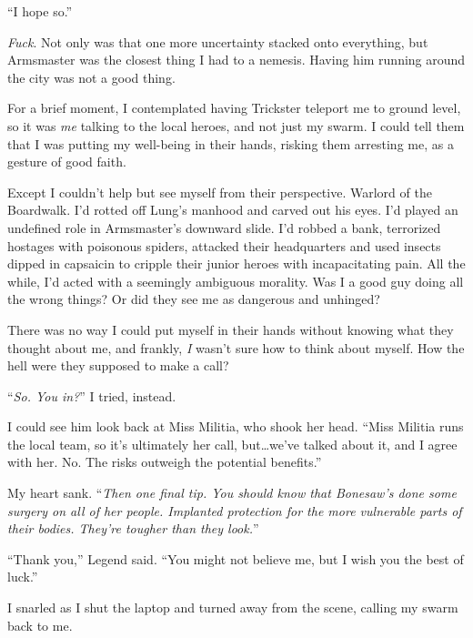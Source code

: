 ``I hope so.''



\emph{Fuck}.  Not only was that one more uncertainty stacked onto everything, but Armsmaster was the closest thing I had to a nemesis.  Having him running around the city was not a good thing.



For a brief moment, I contemplated having Trickster teleport me to ground level, so it was \emph{me} talking to the local heroes, and not just my swarm.  I could tell them that I was putting my well-being in their hands, risking them arresting me, as a gesture of good faith.



Except I couldn't help but see myself from their perspective.  Warlord of the Boardwalk.  I'd rotted off Lung's manhood and carved out his eyes.  I'd played an undefined role in Armsmaster's downward slide.  I'd robbed a bank, terrorized hostages with poisonous spiders, attacked their headquarters and used insects dipped in capsaicin to cripple their junior heroes with incapacitating pain.  All the while, I'd acted with a seemingly ambiguous morality.  Was I a good guy doing all the wrong things?  Or did they see me as dangerous and unhinged?



There was no way I could put myself in their hands without knowing what they thought about me, and frankly, \emph{I} wasn't sure how to think about myself.  How the hell were they supposed to make a call?



``\emph{So.  You in?}''  I tried, instead.



I could see him look back at Miss Militia, who shook her head.  ``Miss Militia runs the local team, so it's ultimately her call, but\ldots we've talked about it, and I agree with her.  No.  The risks outweigh the potential benefits.''



My heart sank.  ``\emph{Then one final tip.  You should know that Bonesaw's done some surgery on all of her people.  Implanted protection for the more vulnerable parts of their bodies.  They're tougher than they look.}''



``Thank you,'' Legend said.  ``You might not believe me, but I wish you the best of luck.''



I snarled as I shut the laptop and turned away from the scene, calling my swarm back to me.




